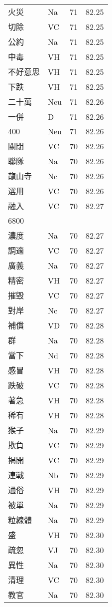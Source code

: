 \documentclass[twocolumn]{book}
\begin{document}
\begin{supertabular}{llrr}
火災 & Na & 71 &  82.25\\
切除 & VC & 71 &  82.25\\
公約 & Na & 71 &  82.25\\
中毒 & VH & 71 &  82.25\\
不好意思 & VH & 71 &  82.25\\
下跌 & VH & 71 &  82.25\\
二十萬 & Neu & 71 &  82.26\\
一併 & D & 71 &  82.26\\
400 & Neu & 71 &  82.26\\
關閉 & VC & 70 &  82.26\\
聯隊 & Na & 70 &  82.26\\
龍山寺 & Nc & 70 &  82.26\\
選用 & VC & 70 &  82.26\\
融入 & VC & 70 &  82.27\\
6800\\
濃度 & Na & 70 &  82.27\\
調適 & VC & 70 &  82.27\\
廣義 & Na & 70 &  82.27\\
精密 & VH & 70 &  82.27\\
摧毀 & VC & 70 &  82.27\\
對岸 & Nc & 70 &  82.27\\
補償 & VD & 70 &  82.28\\
群 & Na & 70 &  82.28\\
當下 & Nd & 70 &  82.28\\
感冒 & VH & 70 &  82.28\\
跌破 & VC & 70 &  82.28\\
著急 & VH & 70 &  82.28\\
稀有 & VH & 70 &  82.28\\
猴子 & Na & 70 &  82.29\\
欺負 & VC & 70 &  82.29\\
揭開 & VC & 70 &  82.29\\
連戰 & Nb & 70 &  82.29\\
通俗 & VH & 70 &  82.29\\
被單 & Na & 70 &  82.29\\
粒線體 & Na & 70 &  82.29\\
盛 & VH & 70 &  82.30\\
疏忽 & VJ & 70 &  82.30\\
異性 & Na & 70 &  82.30\\
清理 & VC & 70 &  82.30\\
教官 & Na & 70 &  82.30\\

\end{supertabular}
\end{document}
